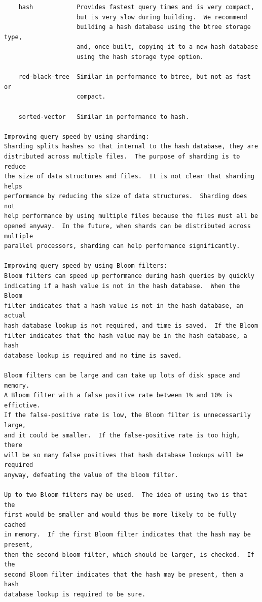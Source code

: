 \documentclass[11pt,twoside]{article}
\begin{document}
\begin{small}
\begin{verbatim}
    hash            Provides fastest query times and is very compact,
                    but is very slow during building.  We recommend
                    building a hash database using the btree storage type,
                    and, once built, copying it to a new hash database
                    using the hash storage type option.

    red-black-tree  Similar in performance to btree, but not as fast or
                    compact.

    sorted-vector   Similar in performance to hash.

Improving query speed by using sharding:
Sharding splits hashes so that internal to the hash database, they are
distributed across multiple files.  The purpose of sharding is to reduce
the size of data structures and files.  It is not clear that sharding helps
performance by reducing the size of data structures.  Sharding does not
help performance by using multiple files because the files must all be
opened anyway.  In the future, when shards can be distributed across multiple
parallel processors, sharding can help performance significantly.

Improving query speed by using Bloom filters:
Bloom filters can speed up performance during hash queries by quickly
indicating if a hash value is not in the hash database.  When the Bloom
filter indicates that a hash value is not in the hash database, an actual
hash database lookup is not required, and time is saved.  If the Bloom
filter indicates that the hash value may be in the hash database, a hash
database lookup is required and no time is saved.

Bloom filters can be large and can take up lots of disk space and memory.
A Bloom filter with a false positive rate between 1% and 10% is effictive.
If the false-positive rate is low, the Bloom filter is unnecessarily large,
and it could be smaller.  If the false-positive rate is too high, there
will be so many false positives that hash database lookups will be required
anyway, defeating the value of the bloom filter.

Up to two Bloom filters may be used.  The idea of using two is that the
first would be smaller and would thus be more likely to be fully cached
in memory.  If the first Bloom filter indicates that the hash may be present,
then the second bloom filter, which should be larger, is checked.  If the
second Bloom filter indicates that the hash may be present, then a hash
database lookup is required to be sure.


\end{verbatim}
\end{small}
\end{document}
